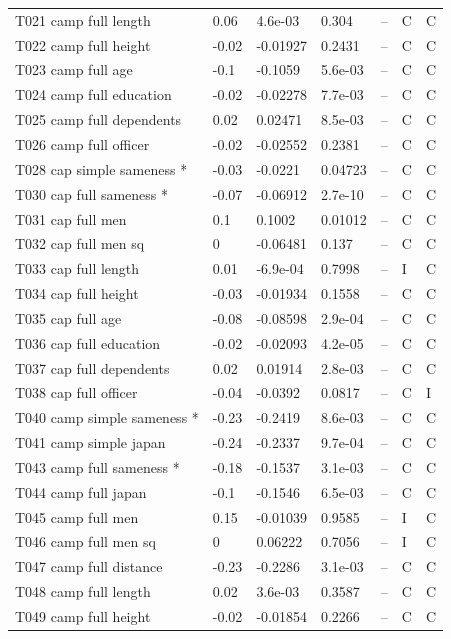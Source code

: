 {\begin{longtable}{@{}p{.245\linewidth}p{.17\linewidth}p{.17\linewidth}p{.085\linewidth}p{.060\linewidth}p{.08\linewidth}p{.07\linewidth}@{}}
T021 camp full length & 0.06 & 4.6e-03 & 0.304 & -- & C & C\\
T022 camp full height & -0.02 & -0.01927 & 0.2431 & -- & C & C\\
T023 camp full age & -0.1 & -0.1059 & 5.6e-03 & -- & C & C\\
T024 camp full education & -0.02 & -0.02278 & 7.7e-03 & -- & C & C\\
T025 camp full dependents & 0.02 & 0.02471 & 8.5e-03 & -- & C & C\\
T026 camp full officer & -0.02 & -0.02552 & 0.2381 & -- & C & C\\
T028 cap simple sameness * & -0.03 & -0.0221 & 0.04723 & -- & C & C\\
T030 cap full sameness * & -0.07 & -0.06912 & 2.7e-10 & -- & C & C\\
T031 cap full men & 0.1 & 0.1002 & 0.01012 & -- & C & C\\
T032 cap full men sq & 0 & -0.06481 & 0.137 & -- & C & C\\
T033 cap full length & 0.01 & -6.9e-04 & 0.7998 & -- & I & C\\
T034 cap full height & -0.03 & -0.01934 & 0.1558 & -- & C & C\\
T035 cap full age & -0.08 & -0.08598 & 2.9e-04 & -- & C & C\\
T036 cap full education & -0.02 & -0.02093 & 4.2e-05 & -- & C & C\\
T037 cap full dependents & 0.02 & 0.01914 & 2.8e-03 & -- & C & C\\
T038 cap full officer & -0.04 & -0.0392 & 0.0817 & -- & C & I\\
T040 camp simple sameness * & -0.23 & -0.2419 & 8.6e-03 & -- & C & C\\
T041 camp simple japan & -0.24 & -0.2337 & 9.7e-04 & -- & C & C\\
T043 camp full sameness * & -0.18 & -0.1537 & 3.1e-03 & -- & C & C\\
T044 camp full japan & -0.1 & -0.1546 & 6.5e-03 & -- & C & C\\
T045 camp full men & 0.15 & -0.01039 & 0.9585 & -- & I & C\\
T046 camp full men sq & 0 & 0.06222 & 0.7056 & -- & I & C\\
T047 camp full distance & -0.23 & -0.2286 & 3.1e-03 & -- & C & C\\
T048 camp full length & 0.02 & 3.6e-03 & 0.3587 & -- & C & C\\
T049 camp full height & -0.02 & -0.01854 & 0.2266 & -- & C & C\\

\end{longtable}}
